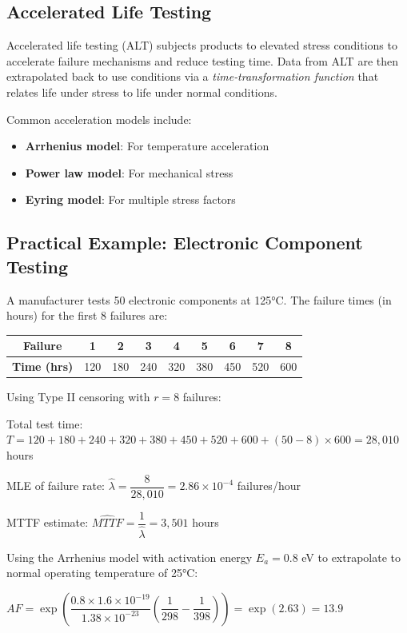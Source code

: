 \documentclass[twoside]{book}
\begin{document}
\subsection{Accelerated Life Testing}

Accelerated life testing (ALT) subjects products to elevated stress conditions to accelerate failure mechanisms and reduce testing time. Data from ALT are then extrapolated back to use conditions via a \emph{time‐transformation function} that relates life under stress to life under normal conditions.

Common acceleration models include:
\begin{itemize}
\item \textbf{Arrhenius model}: For temperature acceleration
\item \textbf{Power law model}: For mechanical stress
\item \textbf{Eyring model}: For multiple stress factors
\end{itemize}

\subsection{Practical Example: Electronic Component Testing}


A manufacturer tests 50 electronic components at 125°C. The failure times (in hours) for the first 8 failures are:
\begin{center}
\begin{tabular}{c|cccccccc}
\toprule
\textbf{Failure} & 1 & 2 & 3 & 4 & 5 & 6 & 7 & 8 \\
\midrule
\textbf{Time (hrs)} & 120 & 180 & 240 & 320 & 380 & 450 & 520 & 600 \\
\bottomrule
\end{tabular}
\end{center}

Using Type II censoring with $r = 8$ failures:

Total test time: $T = 120 + 180 + 240 + 320 + 380 + 450 + 520 + 600 + (50-8) \times 600 = 28,010$ hours

MLE of failure rate: $\hat{\lambda} = \dfrac{8}{28,010} = 2.86 \times 10^{-4}$ failures/hour

MTTF estimate: $\widehat{MTTF} = \dfrac{1}{\hat{\lambda}} = 3,501$ hours

Using the Arrhenius model with activation energy $E_a = 0.8$ eV to extrapolate to normal operating temperature of 25°C:

$AF = \exp\left(\dfrac{0.8 \times 1.6 \times 10^{-19}}{1.38 \times 10^{-23}}\left(\dfrac{1}{298} - \dfrac{1}{398}\right)\right) = \exp(2.63) = 13.9$
\end{document}

